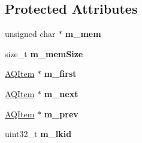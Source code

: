 \subsection*{Protected Attributes}
\begin{DoxyCompactItemize}
\item 
unsigned char $\ast$ {\bfseries m\+\_\+mem}\hypertarget{class_a_q_item_ac5ea4955cd4231d3c378d7660798da22}{}\label{class_a_q_item_ac5ea4955cd4231d3c378d7660798da22}

\item 
size\+\_\+t {\bfseries m\+\_\+mem\+Size}\hypertarget{class_a_q_item_a4e58e13e55d38e68f7d30b10bf998103}{}\label{class_a_q_item_a4e58e13e55d38e68f7d30b10bf998103}

\item 
\hyperlink{class_a_q_item}{A\+Q\+Item} $\ast$ {\bfseries m\+\_\+first}\hypertarget{class_a_q_item_a2d6f7457dac6d0103ac4559717d89848}{}\label{class_a_q_item_a2d6f7457dac6d0103ac4559717d89848}

\item 
\hyperlink{class_a_q_item}{A\+Q\+Item} $\ast$ {\bfseries m\+\_\+next}\hypertarget{class_a_q_item_a9af0456439904c17603c758033665a74}{}\label{class_a_q_item_a9af0456439904c17603c758033665a74}

\item 
\hyperlink{class_a_q_item}{A\+Q\+Item} $\ast$ {\bfseries m\+\_\+prev}\hypertarget{class_a_q_item_a140794796d543ba3cd00f081059f9f8f}{}\label{class_a_q_item_a140794796d543ba3cd00f081059f9f8f}

\item 
uint32\+\_\+t {\bfseries m\+\_\+lkid}\hypertarget{class_a_q_item_a442666d251ed4f17ac8957fe9ddad1e5}{}\label{class_a_q_item_a442666d251ed4f17ac8957fe9ddad1e5}

\end{DoxyCompactItemize}
